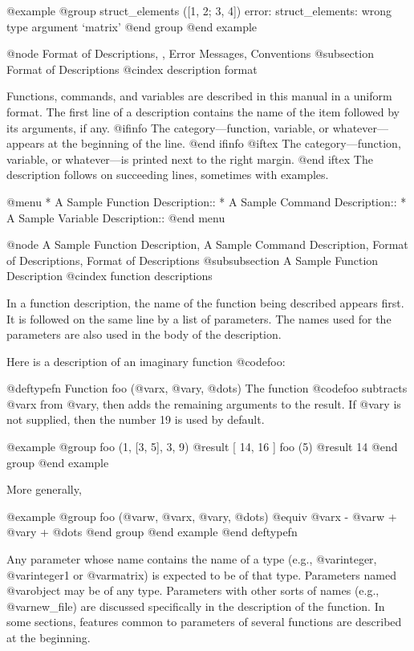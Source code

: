 {@example
@group
struct_elements ([1, 2; 3, 4])
error: struct_elements: wrong type argument `matrix'
@end group
@end example

@node Format of Descriptions,  , Error Messages, Conventions
@subsection Format of Descriptions
@cindex description format

Functions, commands, and variables are described in this manual in a 
uniform format.  The first line of a description contains the name of
the item followed by its arguments, if any.
@ifinfo
The category---function, variable, or whatever---appears at the
beginning of the line.
@end ifinfo
@iftex
The category---function, variable, or whatever---is printed next to the
right margin.
@end iftex
The description follows on succeeding lines, sometimes with examples.

@menu
* A Sample Function Description::  
* A Sample Command Description::  
* A Sample Variable Description::  
@end menu

@node A Sample Function Description, A Sample Command Description, Format of Descriptions, Format of Descriptions
@subsubsection A Sample Function Description
@cindex function descriptions

In a function description, the name of the function being described
appears first.  It is followed on the same line by a list of parameters.
The names used for the parameters are also used in the body of the
description.

Here is a description of an imaginary function @code{foo}:

@deftypefn {Function} {} foo (@var{x}, @var{y}, @dots{})
The function @code{foo} subtracts @var{x} from @var{y}, then adds the
remaining arguments to the result.  If @var{y} is not supplied, then the
number 19 is used by default.

@example
@group
foo (1, [3, 5], 3, 9)
     @result{} [ 14, 16 ]
foo (5)
     @result{} 14
@end group
@end example

More generally,

@example
@group
foo (@var{w}, @var{x}, @var{y}, @dots{})
@equiv{}
@var{x} - @var{w} + @var{y} + @dots{}
@end group
@end example
@end deftypefn

Any parameter whose name contains the name of a type (e.g.,
@var{integer}, @var{integer1} or @var{matrix}) is expected to be of that
type.  Parameters named @var{object} may be of any type.  Parameters
with other sorts of names (e.g., @var{new_file}) are discussed
specifically in the description of the function.  In some sections,
features common to parameters of several functions are described at the
beginning.

}
